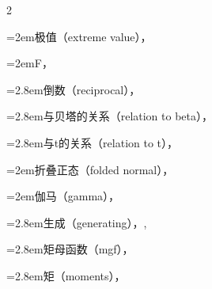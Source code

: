 \begin{multicols}{2}
\par\noindent\hangindent=2em\hspace*{1em}\label{idx:300}极值（extreme value），\hyperref[idxocc:300:139]{\pageref*{idxocc:300:139}}\par
\par\noindent\hangindent=2em\hspace*{1em}\label{idx:301}F，\hyperref[def:5.3.6]{\pageref*{def:5.3.6}}\par
\par\noindent\hangindent=2.8em\hspace*{1.8em}\label{idx:302}倒数（reciprocal），\hyperref[thm:5.3.8]{\pageref*{thm:5.3.8}}\par
\par\noindent\hangindent=2.8em\hspace*{1.8em}\label{idx:303}与贝塔的关系（relation to beta），\hyperref[thm:5.3.8]{\pageref*{thm:5.3.8}}\par
\par\noindent\hangindent=2.8em\hspace*{1.8em}\label{idx:304}与t的关系（relation to t），\hyperref[thm:5.3.8]{\pageref*{thm:5.3.8}}\par
\par\noindent\hangindent=2em\hspace*{1em}\label{idx:305}折叠正态（folded normal），\hyperref[exercise:3.20]{\pageref*{exercise:3.20}}\par
\par\noindent\hangindent=2em\hspace*{1em}\label{idx:306}伽马（gamma），\hyperref[eq:3.3.6]{\pageref*{eq:3.3.6}}\par
\par\noindent\hangindent=2.8em\hspace*{1.8em}\label{idx:307}生成（generating），\hyperref[eq:5.6.5]{\pageref*{eq:5.6.5}}, \hyperref[exercise:5.61]{\pageref*{exercise:5.61}}\par
\par\noindent\hangindent=2.8em\hspace*{1.8em}\label{idx:308}矩母函数（mgf），\hyperref[ex:2.3.8]{\pageref*{ex:2.3.8}}\par
\par\noindent\hangindent=2.8em\hspace*{1.8em}\label{idx:309}矩（moments），\hyperref[exercise:3.17]{\pageref*{exercise:3.17}}\par

\end{multicols}

